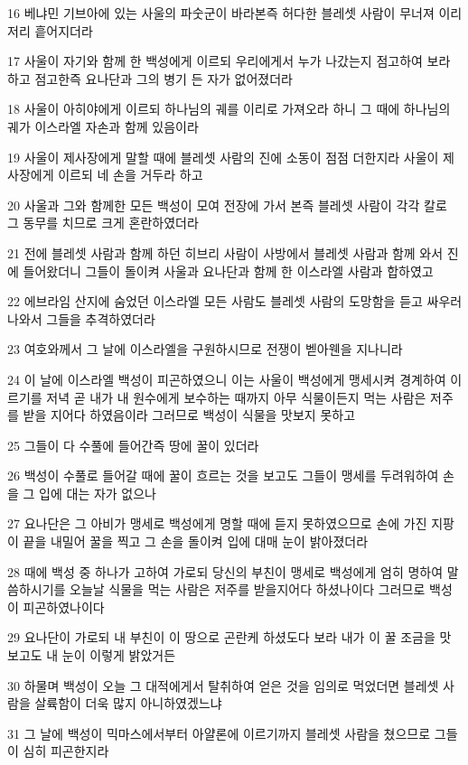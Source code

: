\par 16 베냐민 기브아에 있는 사울의 파숫군이 바라본즉 허다한 블레셋 사람이 무너져 이리저리 흩어지더라
\par 17 사울이 자기와 함께 한 백성에게 이르되 우리에게서 누가 나갔는지 점고하여 보라 하고 점고한즉 요나단과 그의 병기 든 자가 없어졌더라
\par 18 사울이 아히야에게 이르되 하나님의 궤를 이리로 가져오라 하니 그 때에 하나님의 궤가 이스라엘 자손과 함께 있음이라
\par 19 사울이 제사장에게 말할 때에 블레셋 사람의 진에 소동이 점점 더한지라 사울이 제사장에게 이르되 네 손을 거두라 하고
\par 20 사울과 그와 함께한 모든 백성이 모여 전장에 가서 본즉 블레셋 사람이 각각 칼로 그 동무를 치므로 크게 혼란하였더라
\par 21 전에 블레셋 사람과 함께 하던 히브리 사람이 사방에서 블레셋 사람과 함께 와서 진에 들어왔더니 그들이 돌이켜 사울과 요나단과 함께 한 이스라엘 사람과 합하였고
\par 22 에브라임 산지에 숨었던 이스라엘 모든 사람도 블레셋 사람의 도망함을 듣고 싸우러 나와서 그들을 추격하였더라
\par 23 여호와께서 그 날에 이스라엘을 구원하시므로 전쟁이 벧아웬을 지나니라
\par 24 이 날에 이스라엘 백성이 피곤하였으니 이는 사울이 백성에게 맹세시켜 경계하여 이르기를 저녁 곧 내가 내 원수에게 보수하는 때까지 아무 식물이든지 먹는 사람은 저주를 받을 지어다 하였음이라 그러므로 백성이 식물을 맛보지 못하고
\par 25 그들이 다 수풀에 들어간즉 땅에 꿀이 있더라
\par 26 백성이 수풀로 들어갈 때에 꿀이 흐르는 것을 보고도 그들이 맹세를 두려워하여 손을 그 입에 대는 자가 없으나
\par 27 요나단은 그 아비가 맹세로 백성에게 명할 때에 듣지 못하였으므로 손에 가진 지팡이 끝을 내밀어 꿀을 찍고 그 손을 돌이켜 입에 대매 눈이 밝아졌더라
\par 28 때에 백성 중 하나가 고하여 가로되 당신의 부친이 맹세로 백성에게 엄히 명하여 말씀하시기를 오늘날 식물을 먹는 사람은 저주를 받을지어다 하셨나이다 그러므로 백성이 피곤하였나이다
\par 29 요나단이 가로되 내 부친이 이 땅으로 곤란케 하셨도다 보라 내가 이 꿀 조금을 맛보고도 내 눈이 이렇게 밝았거든
\par 30 하물며 백성이 오늘 그 대적에게서 탈취하여 얻은 것을 임의로 먹었더면 블레셋 사람을 살륙함이 더욱 많지 아니하였겠느냐
\par 31 그 날에 백성이 믹마스에서부터 아얄론에 이르기까지 블레셋 사람을 쳤으므로 그들이 심히 피곤한지라
